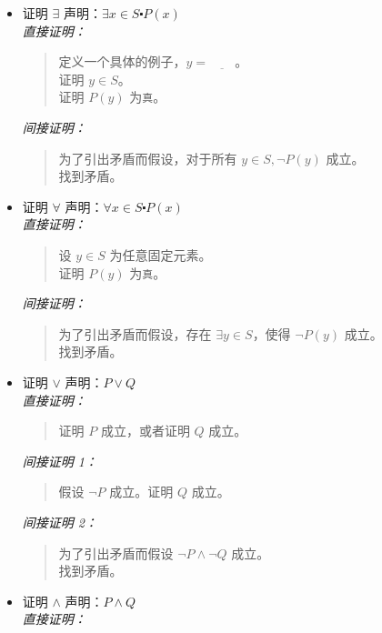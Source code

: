\begin{itemize}
    \item 证明 $\exists$ 声明：$\exists x \in S \centerdot P(x)$\\
            \emph{直接证明：}
            \begin{quote}
                定义一个具体的例子，$y=\underline{\qquad}$。\\
                证明 $y \in S$。\\
                证明 $P(y)$ 为\verb|真|。
            \end{quote}
            \emph{间接证明：}
            \begin{quote}
                为了引出矛盾而假设，对于所有 $y \in S, \neg P(y)$ 成立。\\
                找到矛盾。
            \end{quote}
    \item 证明 $\forall$ 声明：$\forall x \in S \centerdot P(x)$\\
            \emph{直接证明：}
            \begin{quote}
                设 $y \in S$ 为任意固定元素。\\
                证明 $P(y)$ 为\verb|真|。
            \end{quote}
            \emph{间接证明：}
            \begin{quote}
                为了引出矛盾而假设，存在 $\exists y \in S$，使得 $\neg P(y)$ 成立。\\
                找到矛盾。
            \end{quote}
    \item 证明 $\lor$ 声明：$P \lor Q$\\
            \emph{直接证明：}
            \begin{quote}
                证明 $P$ 成立，或者证明 $Q$ 成立。
            \end{quote}
            \emph{间接证明 1：}
            \begin{quote}
                假设 $\neg P$ 成立。证明 $Q$ 成立。
            \end{quote}
            \emph{间接证明 2：}
            \begin{quote}
                为了引出矛盾而假设 $\neg P \land \neg Q$ 成立。\\
                找到矛盾。
            \end{quote}
    \item 证明 $\land$ 声明：$P \land Q$\\
            \emph{直接证明：}

\end{itemize}
